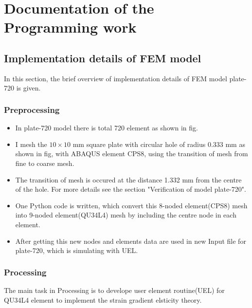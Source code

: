 \documentclass[12pt]{article}
\begin{document}
\section{Documentation of the Programming work}
\subsection{Implementation details of FEM model}
In this section, the brief overview of implementation details of FEM model plate-720 is given.
\subsubsection{ Preprocessing}
\begin{itemize}
	\item In plate-720 model there is total 720 element as shown in fig.
	\item I mesh the $10\times10$ mm square plate with circular hole of radius 0.333 mm as shown in fig, with ABAQUS element CPS8, using the transition of mesh from fine to coarse mesh.
	\item The transition of mesh is occured at the distance 1.332 mm from the centre of the hole. For more details see the section "Verification  of model plate-720".
	\item One Python code is written, which convert this 8-noded element(CPS8) mesh into 9-noded element(QU34L4) mesh by including the centre node in each element.
	\item After getting this new nodes and elements data are used in new Input file for plate-720, which is simulating with UEL.
\end{itemize}
\subsubsection{ Processing}
The main task in Processing is to develope user element routine(UEL) for QU34L4 element to implement the strain gradient elsticity theory.
\end{document}
